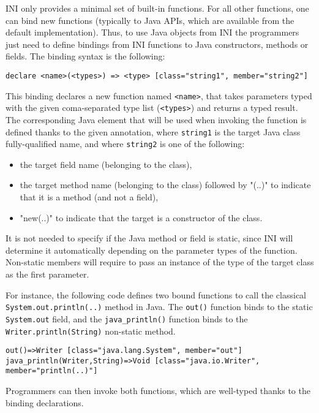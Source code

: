 \documentclass[11pt]{report}
\begin{document}
INI only provides a minimal set of built-in functions. For all other functions, one can bind new functions (typically to Java APIs, which are available from the default implementation). Thus, to use Java objects from INI the programmers just need to define bindings from INI functions to Java constructors, methods or fields. The binding syntax is the following:

\begin{verbatim}
declare <name>(<types>) => <type> [class="string1", member="string2"]
\end{verbatim}

This binding declares a new function named \texttt{<name>}, that takes parameters typed with the given coma-separated type list (\texttt{<types>}) and returns a typed result. The corresponding Java element that will be used when invoking the function is defined thanks to the given annotation, where \texttt{string1} is the target Java class fully-qualified name, and where \texttt{string2} is one of the following:

\begin{itemize}
\item the target field name (belonging to the class),
\item the target method name (belonging to the class) followed by "(..)" to indicate that it is a method (and not a field),
\item "new(..)" to indicate that the target is a constructor of the class.
\end{itemize}

It is not needed to specify if the Java method or field is static, since INI will determine it automatically depending on the parameter types of the function. Non-static members will require to pass an instance of the type of the target class as the first parameter.

For instance, the following code defines two bound functions to call the classical \texttt{System.out.println(..)} method in Java. The \texttt{out()} function binds to the static \texttt{System.out} field, and the \texttt{java\_println()} function binds to the \texttt{Writer.println(String)} non-static method.

{ \small
\begin{verbatim}
out()=>Writer [class="java.lang.System", member="out"]
java_println(Writer,String)=>Void [class="java.io.Writer", member="println(..)"]
\end{verbatim} }

Programmers can then invoke both functions, which are well-typed thanks to the binding declarations.
\end{document}
